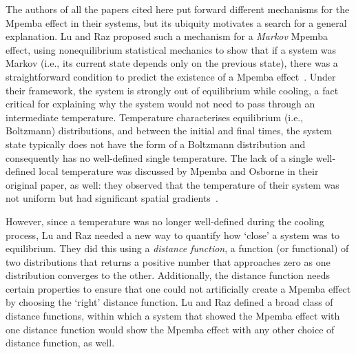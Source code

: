 \documentclass[hyperref={colorlinks=true, urlcolor=blue, citecolor=blue, final, bound}]{sfuthesis}
\begin{document}
The authors of all the papers cited here put forward different mechanisms for the Mpemba effect in their systems, but its ubiquity motivates a search for a general explanation. Lu and Raz proposed such a mechanism for a \textit{Markov} Mpemba effect, using nonequilibrium statistical mechanics to show that if a system was Markov (i.e., its current state depends only on the previous state), there was a straightforward condition to predict the existence of a Mpemba effect~\cite{Lu2017}. Under their framework, the system is strongly out of equilibrium while cooling, a fact critical for explaining why the system would not need to pass through an intermediate temperature. Temperature characterises equilibrium (i.e., Boltzmann) distributions, and between the initial and final times, the system state typically does not have the form of a Boltzmann distribution and consequently has no well-defined single temperature. The lack of a single well-defined local temperature was discussed by Mpemba and Osborne in their original paper, as well: they observed that the temperature of their system was not uniform but had significant spatial gradients~\cite{Mpemba1969}. 

However, since a temperature was no longer well-defined during the cooling process, Lu and Raz needed a new way to quantify how `close' a system was to equilibrium. They did this using a \textit{distance function}, a function (or functional) of two distributions that returns a positive number that approaches zero as one distribution converges to the other. Additionally, the distance function needs certain properties to ensure that one could not artificially create a Mpemba effect by choosing the `right' distance function. Lu and Raz defined a broad class of distance functions, within which a system that showed the Mpemba effect with one distance function would show the Mpemba effect with any other choice of distance function, as well. 
\end{document}
